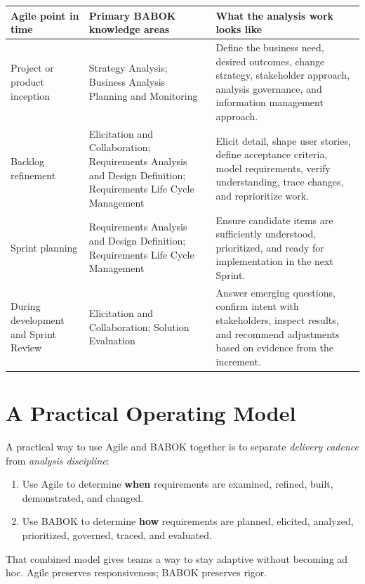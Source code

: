 \documentclass[11pt]{article}
\begin{document}
\renewcommand{\arraystretch}{1.25}
\begin{tabularx}{\textwidth}{>{\raggedright\arraybackslash}p{} >{\raggedright\arraybackslash}p{} X}
\toprule
\textbf{Agile point in time} & \textbf{Primary BABOK knowledge areas} & \textbf{What the analysis work looks like} \\
\midrule
Project or product inception & Strategy Analysis; Business Analysis Planning and Monitoring & Define the business need, desired outcomes, change strategy, stakeholder approach, analysis governance, and information management approach. \\
\addlinespace
Backlog refinement & Elicitation and Collaboration; Requirements Analysis and Design Definition; Requirements Life Cycle Management & Elicit detail, shape user stories, define acceptance criteria, model requirements, verify understanding, trace changes, and reprioritize work. \\
\addlinespace
Sprint planning & Requirements Analysis and Design Definition; Requirements Life Cycle Management & Ensure candidate items are sufficiently understood, prioritized, and ready for implementation in the next Sprint. \\
\addlinespace
During development and Sprint Review & Elicitation and Collaboration; Solution Evaluation & Answer emerging questions, confirm intent with stakeholders, inspect results, and recommend adjustments based on evidence from the increment. \\
\bottomrule
\end{tabularx}

\section{A Practical Operating Model}

A practical way to use Agile and BABOK together is to separate \emph{delivery cadence} from \emph{analysis discipline}:

\begin{enumerate}
  \item Use Agile to determine \textbf{when} requirements are examined, refined, built, demonstrated, and changed.
  \item Use BABOK to determine \textbf{how} requirements are planned, elicited, analyzed, prioritized, governed, traced, and evaluated.
\end{enumerate}

That combined model gives teams a way to stay adaptive without becoming ad hoc. Agile preserves responsiveness; BABOK preserves rigor.
\end{document}
